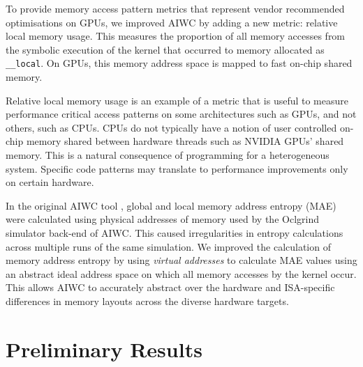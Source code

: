\documentclass[review=false, sigchi]{acmart}
\begin{document}
	To provide memory access pattern metrics that represent vendor recommended optimisations on GPUs, we improved AIWC by adding a new metric: relative local memory usage. This measures the proportion of all memory accesses from the symbolic execution of the kernel that occurred to memory allocated as \texttt{\_\_local}. On GPUs, this memory address space is mapped to fast on-chip shared memory.
	
	Relative local memory usage is an example of a metric that is useful to measure performance critical access patterns on some architectures such as GPUs, and not others, such as CPUs. CPUs do not typically have a notion of user controlled on-chip memory shared between hardware threads such as NVIDIA GPUs' shared memory. This is a natural consequence of programming for a heterogeneous system. Specific code patterns may translate to performance improvements only on certain hardware.
	
	In the original AIWC tool \cite{beau_johnston_2017_1134175}, global and local memory address entropy (MAE) were calculated using physical addresses of memory used by the Oclgrind simulator back-end of AIWC. This caused irregularities in entropy calculations across multiple runs of the same simulation. We improved the calculation of memory address entropy by using \textit{virtual addresses} to calculate MAE values using an abstract ideal address space on which all memory accesses by the kernel occur. This allows AIWC to accurately abstract over the hardware and ISA-specific differences in memory layouts across the diverse hardware targets.
		
	\section{Preliminary Results} \label{preliminary results}
	
\end{document}
